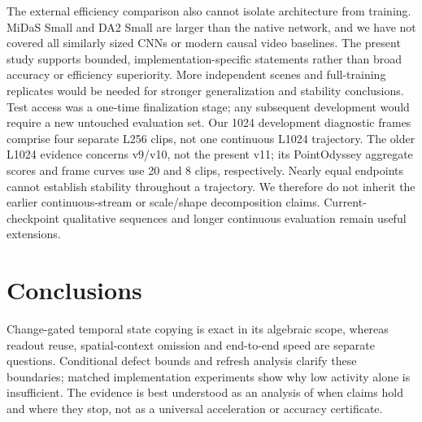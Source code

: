 \documentclass[mathematics,article,submit,moreauthors]{Definitions/mdpi}
\begin{document}
The external efficiency comparison also cannot isolate architecture from training.
MiDaS Small and DA2 Small are larger than the native network, and we have not covered
all similarly sized CNNs or modern causal video baselines. The present study supports
bounded, implementation-specific statements rather than broad accuracy or efficiency
superiority. More independent scenes and full-training replicates would be needed for
stronger generalization and stability conclusions. Test access was a one-time finalization
stage; any subsequent development would require a new untouched evaluation set.
Our 1024 development diagnostic frames comprise four separate L256 clips, not
one continuous L1024 trajectory. The older L1024 evidence concerns v9/v10,
not the present v11; its PointOdyssey aggregate scores and frame curves use
20 and 8 clips, respectively. Nearly equal endpoints cannot establish stability
throughout a trajectory. We therefore do not inherit the earlier continuous-stream
or scale/shape decomposition claims. Current-checkpoint qualitative sequences
and longer continuous evaluation remain useful extensions.

\section{Conclusions}
Change-gated temporal state copying is exact in its algebraic scope, whereas readout
reuse, spatial-context omission and end-to-end speed are separate questions. Conditional
defect bounds and refresh analysis clarify these boundaries; matched implementation
experiments show why low activity alone is insufficient. The evidence is best understood
as an analysis of when claims hold and where they stop, not as a universal acceleration
or accuracy certificate.

\end{document}
